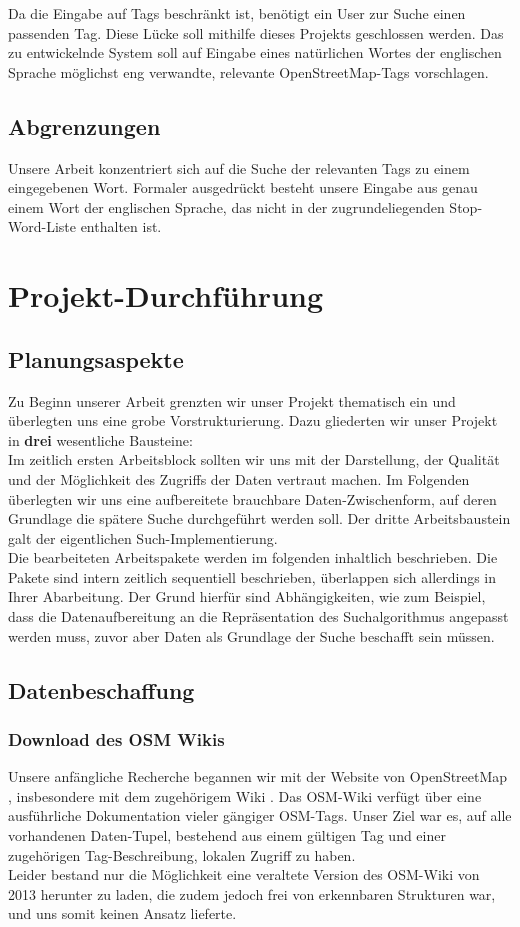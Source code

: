 \documentclass[12pt,pdftex,a4paper]{article}
\begin{document}
Da die Eingabe auf Tags beschränkt ist, benötigt ein User zur Suche einen passenden Tag. Diese Lücke soll mithilfe dieses Projekts geschlossen werden. Das zu entwickelnde System soll auf Eingabe eines natürlichen Wortes der englischen Sprache möglichst eng verwandte, relevante OpenStreetMap-Tags vorschlagen.

\subsection{Abgrenzungen} \label{sec:abgrenzung}
Unsere Arbeit konzentriert sich auf die Suche der relevanten Tags zu einem eingegebenen Wort. Formaler ausgedrückt besteht unsere Eingabe aus genau einem Wort der englischen Sprache, das nicht in der zugrundeliegenden Stop-Word-Liste enthalten ist.


\section{Projekt-Durchführung}
\subsection{Planungsaspekte}
Zu Beginn unserer Arbeit grenzten wir unser Projekt thematisch ein und überlegten uns eine grobe Vorstrukturierung.
Dazu gliederten wir unser Projekt in \textbf{drei} wesentliche Bausteine:\\
Im zeitlich ersten Arbeitsblock sollten wir uns mit der Darstellung, der Qualität und der Möglichkeit des Zugriffs der Daten vertraut machen. Im Folgenden überlegten wir uns eine aufbereitete brauchbare Daten-Zwischenform, auf deren Grundlage die spätere Suche durchgeführt werden soll. Der dritte Arbeitsbaustein galt der eigentlichen Such-Implementierung.\\
Die bearbeiteten Arbeitspakete werden im folgenden inhaltlich beschrieben. Die Pakete sind intern zeitlich sequentiell beschrieben, überlappen sich allerdings in Ihrer Abarbeitung. Der Grund hierfür sind Abhängigkeiten, wie zum Beispiel, dass die Datenaufbereitung an die Repräsentation des Suchalgorithmus angepasst werden muss, zuvor aber Daten als Grundlage der Suche beschafft sein müssen.

\subsection{Datenbeschaffung}
\subsubsection{Download des OSM Wikis}
Unsere anfängliche Recherche begannen wir mit der Website von OpenStreetMap \cite{WebsiteOSM}, insbesondere mit dem zugehörigem Wiki \cite{WebsiteOSMWiki}. Das OSM-Wiki verfügt über eine ausführliche Dokumentation vieler gängiger OSM-Tags. Unser Ziel war es, auf alle vorhandenen Daten-Tupel, bestehend aus einem gültigen Tag und einer zugehörigen Tag-Beschreibung, lokalen Zugriff zu haben.
\\
Leider bestand nur die Möglichkeit eine veraltete Version des OSM-Wiki von 2013 herunter zu laden, die zudem jedoch frei von erkennbaren Strukturen war, und uns somit keinen Ansatz lieferte. 
\\
\end{document}
